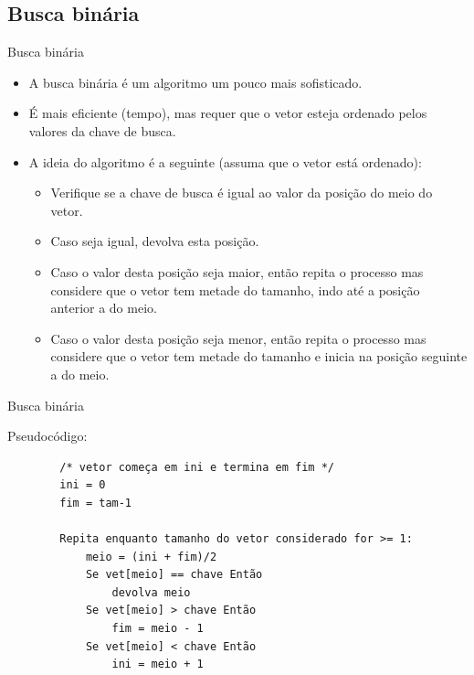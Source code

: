 \documentclass[handout]{beamer}
\begin{document}
\subsection{Busca binária}

\begin{frame}[fragile]{Busca binária}

    \begin{itemize}
        \item A busca binária é um algoritmo um pouco mais sofisticado.
        \item É mais eficiente (tempo), mas requer que o vetor esteja ordenado pelos valores da chave de busca.
        \item A ideia do algoritmo é a seguinte (assuma que o vetor está ordenado):
        \begin{itemize}
            \item Verifique se a chave de busca é igual ao valor da posição do meio do vetor.
            \item Caso seja igual, devolva esta posição.
            \item Caso o valor desta posição seja maior, então repita o processo mas considere que o vetor tem metade do tamanho, indo até a posição anterior a do meio.
            \item Caso o valor desta posição seja menor, então repita o processo mas considere que o vetor tem metade do tamanho e inicia na posição seguinte a do meio.
        \end{itemize}
    \end{itemize}

\end{frame}

\begin{frame}[fragile]{Busca binária}

    Pseudocódigo:
    \begin{verbatim}
        /* vetor começa em ini e termina em fim */
        ini = 0
        fim = tam-1

        Repita enquanto tamanho do vetor considerado for >= 1:
            meio = (ini + fim)/2
            Se vet[meio] == chave Então
                devolva meio
            Se vet[meio] > chave Então
                fim = meio - 1
            Se vet[meio] < chave Então
                ini = meio + 1
    \end{verbatim}

\end{frame}
\end{document}
